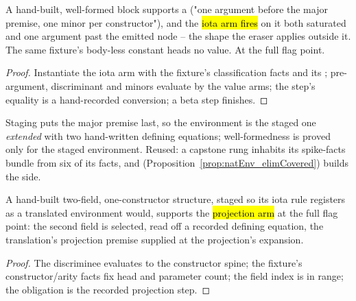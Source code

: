 \begin{proposition}
\label{prop:NatWitness-seval_iota_fires}
\leanok
{}
 A hand-built, well-formed  block supports a  ("one
argument before the major premise, one minor per constructor"), and the \hl{iota arm fires} on it
both saturated and one argument past the emitted node -- the shape the eraser applies outside it.
The same fixture's body-less constant heads no value.
 At the full flag point.
\end{proposition}
\begin{proof}
\leanok
{}
 Instantiate the iota arm with the fixture's classification facts and its
; pre-argument, discriminant and minors evaluate by the value arms; the step's
equality is a hand-recorded conversion; a beta step finishes.
\end{proof}

\begin{remark}
 Staging puts the major premise last, so the environment is the staged one
\emph{extended} with two hand-written defining equations; well-formedness is proved only for the
staged environment. Reused: a capstone rung inhabits its spike-facts bundle from six of its facts,
and  (Proposition~\ref{prop:natEnv_elimCovered}) builds the \lbox{} side.
\end{remark}

\begin{proposition}
\label{prop:ProjWitness-seval_proj_fires}
\leanok
{}
 A hand-built two-field, one-constructor structure, staged so its iota rule
registers as a translated environment would, supports the \hl{projection arm} at the full flag
point: the second field is selected,  read off a recorded defining equation, the
translation's projection premise supplied at the projection's expansion.
\end{proposition}
\begin{proof}
\leanok
{}
 The discriminee evaluates to the constructor spine; the fixture's constructor/arity
facts fix head and parameter count; the field index is in range; the obligation is the recorded
projection step.
\end{proof}

